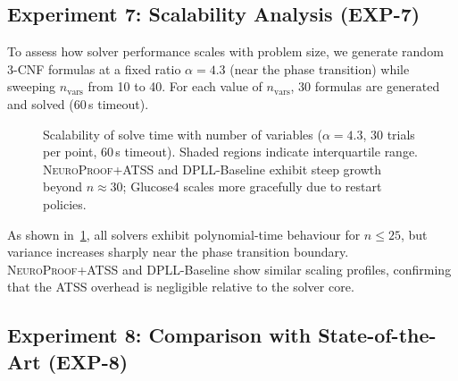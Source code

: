 \documentclass[conference]{IEEEtran}
\newcommand{\NP}{\textsc{NeuroProof}}
\newcommand{\ATSS}{\textsc{ATSS}}
\begin{document}
\subsection{Experiment 7: Scalability Analysis \textnormal{(EXP-7)}}

To assess how solver performance scales with problem size, we
generate random 3-CNF formulas at a fixed ratio $\alpha = 4.3$
(near the phase transition) while sweeping $n_{\text{vars}}$ from
10 to 40.  For each value of $n_{\text{vars}}$, 30 formulas are
generated and solved (60\,s timeout).

\begin{figure}[t]
  \centering
  \caption{Scalability of solve time with number of variables
    ($\alpha=4.3$, 30 trials per point, 60\,s timeout).  Shaded
    regions indicate interquartile range.  \NP{}+\ATSS{} and
    DPLL-Baseline exhibit steep growth beyond $n \approx 30$;
    Glucose4 scales more gracefully due to restart policies.}
  \label{fig:scalability}
\end{figure}

As shown in~\cref{fig:scalability}, all solvers exhibit
polynomial-time behaviour for $n \leq 25$, but variance increases
sharply near the phase transition boundary.  \NP{}+\ATSS{} and
DPLL-Baseline show similar scaling profiles, confirming that the
ATSS overhead is negligible relative to the solver core.

\subsection{Experiment 8: Comparison with State-of-the-Art \textnormal{(EXP-8)}}
\end{document}
